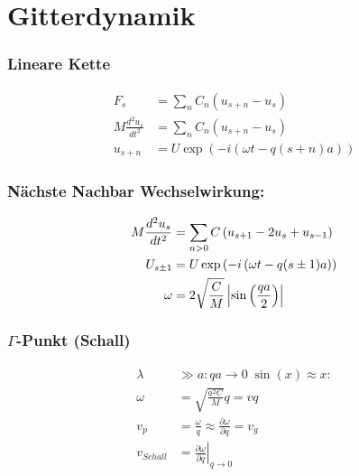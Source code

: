 \section{Gitterdynamik}


\subsubsection*{Lineare Kette}

\begin{equation*}
    \begin{aligned}
        F_s &= \sum_n C_n \left(u_{s+n} - u_s\right) \\
        M \frac{d^2 u_s}{dt^2} &= \sum_n C_n \left(u_{s+n} - u_s\right) \\
        u_{s+n} &= U \exp \left(-i\left(\omega t - q (s+n)a\right)\right)
    \end{aligned}
\end{equation*}

\subsubsection*{Nächste Nachbar Wechselwirkung:}
\begin{equation*}
    \begin{aligned}
        M \frac{d^2 u_s}{dt^2} &= \sum_{n>0} C \left(u_{s+1} -2u_s + u_{s-1}\right) \\
        U_{s \pm 1} &= U \exp \left(-i \left(\omega t - q (s \pm 1)a\right)\right) \\
        \omega &= 2 \sqrt{\frac{C}{M}} \left\vert\sin \left(\frac{qa}{2}\right)\right\vert
    \end{aligned}
\end{equation*}

\subsubsection*{$\Gamma$-Punkt (Schall)}
\begin{equation*}
    \begin{aligned}
        \lambda &\gg a: qa \rightarrow 0 \; \sin(x) \approx x: \\
        \omega &= \sqrt{\frac{a^2C}{M}}q = v q \\
        v_p &= \frac{\omega}{q} \approx \frac{\partial \omega}{\partial q} = v_g \\
        v_{Schall} &= \left.\frac{\partial \omega}{\partial q} \right|_{q \rightarrow 0}
    \end{aligned}
\end{equation*}


